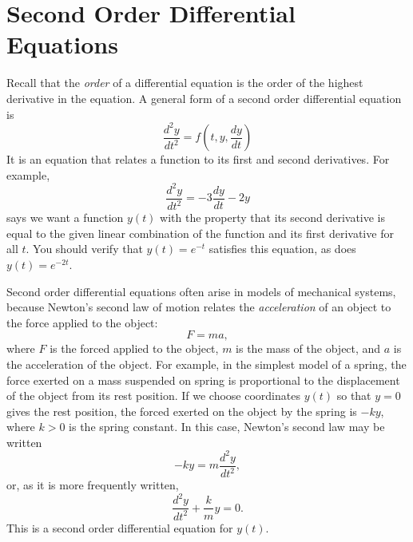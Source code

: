 \section{Second Order Differential Equations}
Recall that the \emph{order} of a differential equation
is the order of the highest derivative in the equation.
A general form of a second order differential equation is
\begin{equation}
   \frac{d^2y}{dt^2} = f\left(t,y,\frac{dy}{dt}\right)
\label{eqn:generalsecondorder}
\end{equation}
It is an equation that relates a function to its first
and second derivatives.  For example,
\begin{equation}
  \frac{d^2y}{dt^2} = -3\frac{dy}{dt}-2y
  \label{eqn:linearexample} 
\end{equation}
says we want a function $y(t)$ with the property that its second derivative
is equal to the given linear combination of the function and  its first derivative
for all $t$.  You should verify that $y(t)=e^{-t}$ satisfies this equation,
as does $y(t) = e^{-2t}$.

Second order differential equations often arise in models
of mechanical systems, because Newton's second law of motion
relates the \emph{acceleration} of an object to the force applied
to the object:
\begin{equation}
   F = ma,
\end{equation}
where $F$ is the forced applied to the object, $m$ is the
mass of the object, and $a$ is the acceleration of the object.
For example, in the simplest model of a spring, the force
exerted on a mass suspended on spring is proportional to the
displacement of the object from its rest position.
If we choose coordinates $y(t)$ so that $y=0$ gives the
rest position, the forced exerted on the object by
the spring is $-ky$, where $k>0$ is the spring constant.
In this case, Newton's second law may be written
\begin{equation}
   -ky = m\frac{d^2y}{dt^2},  
\end{equation}
or, as it is more frequently written,
\begin{equation}
   \frac{d^2y}{dt^2} + \frac{k}{m}y = 0.
\end{equation}
This is a second order differential equation for $y(t)$.

